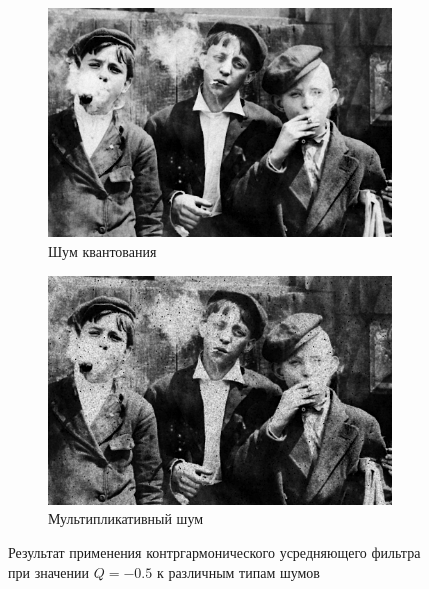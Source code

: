 \begin{figure}[ht]
\begin{subfigure}[b]{0.5\linewidth}
      \includegraphics[width=0.95\linewidth]{../Contraharmonic_Filter/Contraharmonic_Poisson_noise_(m,n=(3,_3),q=-0.5).jpg} 
      \caption{Шум квантования} 
      \label{contraharmonic_-0.5:e}
    \end{subfigure}%
    \begin{subfigure}[b]{0.5\linewidth}
        \centering
        \includegraphics[width=0.95\linewidth]{../Contraharmonic_Filter/Contraharmonic_Speckle_noise_(m,n=(3,_3),q=-0.5).jpg} 
        \caption{Мультипликативный шум} 
        \label{contraharmonic_-0.5:f} 
    \end{subfigure} 
    \caption{Результат применения контргармонического усредняющего фильтра при значении $Q = -0.5$ к различным типам шумов}
    \label{img:contraharmonic_-0.5} 
  \end{figure}

